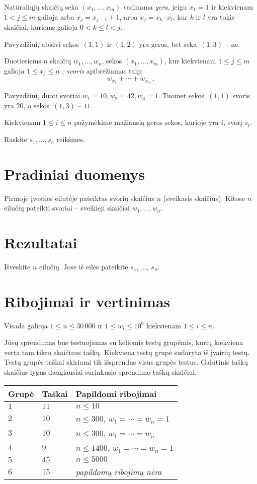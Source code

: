 
\noindent
Natūraliųjų skaičių seka $(x_1,\ldots,x_m)$ vadinama \emph{gera}, jeigu  $x_1 = 1$ ir kiekvienam $1 < j \leq m$ galioja arba $x_j=x_{j-1}+1$, arba $x_j=x_k\cdot x_l$, kur $k$ ir $l$ yra tokie skaičiai, kuriems galioja $0< k\leq l< j$.

Pavyzdžiui, abidvi sekos~$(1,1)$ ir $(1,2)$ yra geros, bet seka~$(1,3)$ -- ne.

Duotiesiems $n$ skaičių $w_1,\ldots,w_n$, sekos $(x_1,\ldots,x_m)$, kur kiekvienam $1\leq j\leq m$
 galioja $1\leq x_j \leq n$ , \emph{svoris} apibrėžiamas taip:
\[ w_{x_1} +\cdots +w_{x_m}\,.\] 

Pavyzdžiui, duoti svoriai $w_1=10,  w_2=42,w_3= 1$. Tuomet sekos~$(1,1)$ svoris yra $20$, o sekos~$(1,3)$ -- $11$.

Kiekvienam $1\leq i\leq n$ pažymėkime mažiausią geros sekos, kurioje yra $i$, svorį $s_i$.

Raskite $s_1,\ldots ,s_n$ reikšmes.

\section*{Pradiniai duomenys}

Pirmoje įvesties eilutėje pateiktas svorių skaičius $n$ (sveikasis skaičius).
Kitose $n$ eilučių pateikti svoriai -- sveikieji skaičiai $w_1, \ldots, w_n$.

\section*{Rezultatai}

Išveskite $n$ eilučių. Jose iš eilės pateikite $s_1$, $\ldots$, $s_n$.

\section*{Ribojimai ir vertinimas}

Visada galioja
$1\leq n \leq 30\,000$ %
ir
$1\leq w_i \leq 10^6$ kiekvienam $1\leq i \leq n$.%

Jūsų sprendimas bus testuojamas su keliomis testų grupėmis, kurių kiekviena verta tam tikro skaičiaus taškų.
Kiekviena testų grupė sudaryta iš įvairių testų.
Testų grupės taškai skiriami tik išsprendus visus grupės testus.
Galutinis taškų skaičius lygus daugiausiai surinkusio sprendimo taškų skaičiui.

\medskip
\begin{tabular}{lll}
Grupė & Taškai & Papildomi ribojimai \\\hline
$1$   & $11$ & $n\leq 10$ \\
$2$   & $10$ & $n\leq 300$, $w_1=\cdots=w_n = 1$ \\
$3$   & $10$ & $n\leq 300$, $w_1=\cdots=w_n$ \\ %
$4$   & $9$ & $n\leq 1400$, $w_1=\cdots=w_n = 1$ \\
$5$   & $45$ & $n\leq 5000$\\
$6$   & $15$ & \emph{papildomų ribojimų nėra}
\end{tabular}
